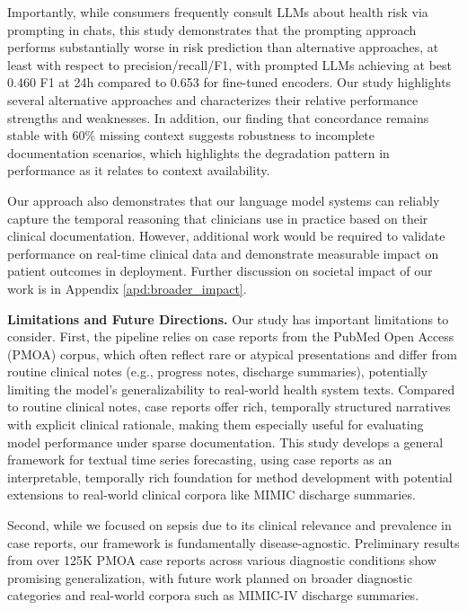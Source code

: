 Importantly, while consumers frequently consult LLMs about health risk via prompting in chats, this study demonstrates that the prompting approach performs substantially worse in risk prediction than alternative approaches, at least with respect to precision/recall/F1, with prompted LLMs achieving at best 0.460 F1 at 24h compared to 0.653 for fine-tuned encoders.
Our study highlights several alternative approaches and characterizes their relative performance strengths and weaknesses.
In addition, our finding that concordance remains stable with 60\% missing context suggests robustness to incomplete documentation scenarios, which highlights the degradation pattern in performance as it relates to context availability. 

Our approach also demonstrates that our language model systems can reliably capture the temporal reasoning that clinicians use in practice based on their clinical documentation. However, additional work would be required to validate performance on real-time clinical data and demonstrate measurable impact on patient outcomes in deployment. Further discussion on societal impact of our work is in Appendix \ref{apd:broader_impact}.

\textbf{Limitations and Future Directions.} 
Our study has important limitations to consider. First, the pipeline relies on case reports from the PubMed Open Access (PMOA) corpus, which often reflect rare or atypical presentations and differ from routine clinical notes (e.g., progress notes, discharge summaries), potentially limiting the model's generalizability to real-world health system texts. Compared to routine clinical notes, case reports offer rich, temporally structured narratives with explicit clinical rationale, making them especially useful for evaluating model performance under sparse documentation. This study develops a general framework for textual time series forecasting, using case reports as an interpretable, temporally rich foundation for method development with potential extensions to real-world clinical corpora like MIMIC discharge summaries.

Second, while we focused on sepsis due to its clinical relevance and prevalence in case reports, our framework is fundamentally disease-agnostic. Preliminary results from over 125K PMOA case reports across various diagnostic conditions show promising generalization, with future work planned on broader diagnostic categories and real-world corpora such as MIMIC-IV discharge summaries.

